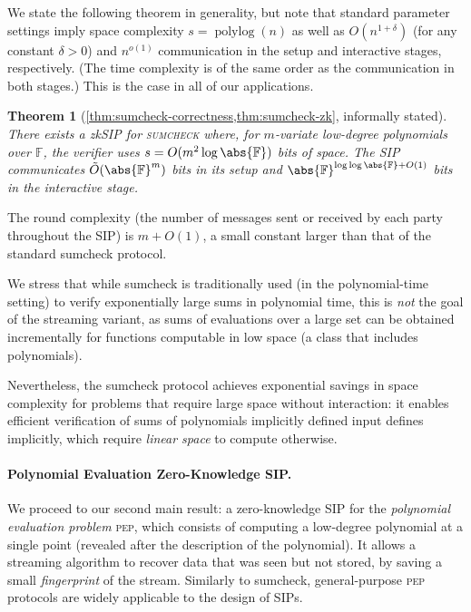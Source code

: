 \documentclass[10pt,a4paper]{article}
\newif\iflipics\lipicsfalse
\newtheorem{theorem}{Theorem}[section]
\theoremstyle{definition}
\newcommand{\zksip}{\textrm{zkSIP}}
\newcommand{\field}{\mathbb{F}}
\newcommand{\polylog}{\operatorname{polylog}}
\newcommand{\indexproblem}{\normalfont\textsc{index}\xspace}
\newcommand{\pep}{\normalfont\textsc{pep}\xspace}
\newcommand{\sumcheck}{\normalfont\textsc{sumcheck}\xspace}
\newcommand{\dimension}{m}
\begin{document}
We state the following theorem in generality, but note that standard parameter settings imply space complexity $s = \polylog(n)$ as well as $O(n^{1 + \delta})$ (for any constant $\delta > 0$) and $n^{o(1)}$ communication in the setup and interactive stages, respectively. (The time complexity is of the same order as the communication in both stages.) This is the case in all of our applications.

\begin{theorem}[\cref{thm:sumcheck-correctness,thm:sumcheck-zk}, informally stated]
    \label{infthm:zk-sumcheck}
    There exists a \zksip{} for \sumcheck where, for $\dimension$-variate low-degree polynomials over $\field$, the verifier uses $s = O(\dimension^2 \log \abs{\field})$ bits of space. The SIP communicates $\tilde O(\abs{\field}^\dimension)$ bits in its setup and $\abs{\field}^{\log\log \abs{\field} + O(1)}$ bits in the interactive stage.
\end{theorem}

The round complexity (the number of messages sent or received by each party throughout the SIP) is $\dimension + O(1)$, a small constant larger than that of the standard sumcheck protocol.

We stress that while sumcheck is traditionally used (in the polynomial-time setting) to verify exponentially large sums in polynomial time, this is \emph{not} the goal of the streaming variant, as sums of evaluations over a large set can be obtained incrementally for functions computable in low space (a class that includes polynomials).

Nevertheless, the sumcheck protocol achieves exponential savings in space complexity for problems that require large space without interaction: it enables efficient verification of sums of polynomials implicitly defined  input defines implicitly, which require \emph{linear space} to compute otherwise.

\paragraph*{Polynomial Evaluation Zero-Knowledge SIP\iflipics\else.\fi}
We proceed to our second main result: a zero-knowledge SIP for the \emph{polynomial evaluation problem} \pep, which consists of computing a low-degree polynomial at a single point (revealed after the description of the polynomial). It allows a streaming algorithm to recover data that was seen but not stored, by saving a small \emph{fingerprint} of the stream.
Similarly to sumcheck, general-purpose \pep protocols are widely applicable to the design of SIPs.%
\end{document}

